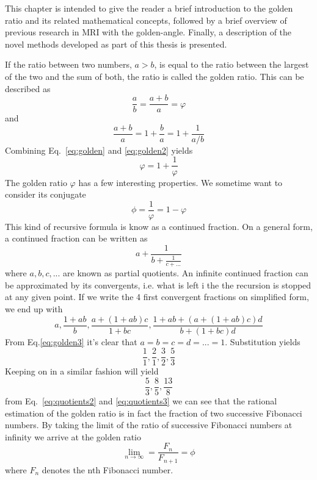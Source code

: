 This chapter is intended to give the reader a brief introduction to the golden ratio and its related mathematical concepts, followed by a brief overview of previous research in MRI with the golden-angle. Finally, a description of the novel methods developed as part of this thesis is presented.

If the ratio between two numbers, $a > b$, is equal to the ratio between the largest of the two and the sum of both, the ratio is called the golden ratio. This can be described as
\begin{equation}
    \label{eq:golden}
    \frac{a}{b} = \frac{a+b}{a} = \varphi
\end{equation}
and
\begin{equation}
    \label{eq:golden2}
    \frac{a+b}{a} = 1 + \frac{b}{a} =
    1 + \frac{1}{a/b}
\end{equation}
Combining Eq.~\ref{eq:golden} and \ref{eq:golden2} yields
\begin{equation}
    \label{eq:golden3}
    \varphi =
    1 + \frac{1}{\varphi}
\end{equation}
The golden ratio $\varphi$ has a few interesting properties. We sometime want to consider its conjugate
\begin{equation}
    \label{eq:conjugate_golden}
    \phi = \frac{1}{\varphi} = 1 - \varphi
\end{equation}
This kind of recursive formula is know as a continued fraction. On a general form, a continued fraction can be written as
\begin{equation}
    \label{eq:contf}
    a + \frac{1}{b + \frac{1}{c + ...}}
\end{equation}
where $a,b,c,...$ are known as partial quotients. An infinite continued fraction can be approximated by its convergents, i.e. what is left i the the recursion is stopped at any given point. If we write the 4 first convergent fractions on simplified form, we end up with
\begin{equation}
\label{eq:quotients}
a, \frac{1+ab}{b}, \frac{a+(1+ab)c}{1+bc}, \frac{1+ab+(a+(1+ab)c)d}{b+(1+bc)d}
\end{equation}
From Eq.\ref{eq:golden3} it's clear that $a = b = c = d = ... = 1$. Substitution yields
\begin{equation}
\label{eq:quotients2}
\frac{1}{1}, \frac{2}{1}, \frac{3}{2}, \frac{5}{3}
\end{equation}
Keeping on in a similar fashion will yield
\begin{equation}
\label{eq:quotients3}
\frac{5}{3}, \frac{8}{5}, \frac{13}{8}
\end{equation}
from Eq.~\ref{eq:quotients2} and \ref{eq:quotients3} we can see that the rational estimation of the golden ratio is in fact the fraction of two successive Fibonacci numbers. By taking the limit of the ratio of successive Fibonacci numbers at infinity we arrive at the golden ratio
\begin{equation}
    \lim_{n\to\infty} = \frac{F_n}{F_{n+1}} = \phi
    \label{eq:limit0}
\end{equation}
where $F_n$ denotes the nth Fibonacci number.

